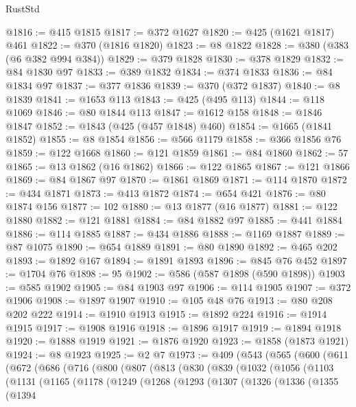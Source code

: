 \begin{lexlean}{RustStd}
\begin{coremodule}
@1816 := @415 @1815
@1817 := @372 @1627
@1820 := @425 (@1621 @1817) @461
@1822 := @370 (@1816 @1820)
@1823 := @8 @1822
@1828 := @380 (@383 (@6 @382 @994 @384))
@1829 := @379 @1828
@1830 := @378 @1829
@1832 := @84 @1830 @97
@1833 := @389 @1832
@1834 := @374 @1833
@1836 := @84 @1834 @97
@1837 := @377 @1836
@1839 := @370 (@372 @1837)
@1840 := @8 @1839
@1841 := @1653 @113
@1843 := @425 (@495 @113)
@1844 := @118 @1069
@1846 := @80 @1844 @113
@1847 := @1612 @158
@1848 := @1846 @1847
@1852 := @1843 (@425 (@457 @1848) @460)
@1854 := @1665 (@1841 @1852)
@1855 := @8 @1854
@1856 := @566 @1179
@1858 := @366 @1856 @76
@1859 := @122 @1668
@1860 := @121 @1859
@1861 := @84 @1860
@1862 := 57
@1865 := @13 @1862 (@16 @1862)
@1866 := @122 @1865
@1867 := @121 @1866
@1869 := @84 @1867 @97
@1870 := @1861 @1869
@1871 := @114 @1870
@1872 := @434 @1871
@1873 := @413 @1872
@1874 := @654 @421
@1876 := @80 @1874 @156
@1877 := 102
@1880 := @13 @1877 (@16 @1877)
@1881 := @122 @1880
@1882 := @121 @1881
@1884 := @84 @1882 @97
@1885 := @441 @1884
@1886 := @114 @1885
@1887 := @434 @1886
@1888 := @1169 @1887
@1889 := @87 @1075
@1890 := @654 @1889
@1891 := @80 @1890
@1892 := @465 @202
@1893 := @1892 @167
@1894 := @1891 @1893
@1896 := @845 @76 @452
@1897 := @1704 @76
@1898 := 95
@1902 := @586 (@587 @1898 (@590 @1898))
@1903 := @585 @1902
@1905 := @84 @1903 @97
@1906 := @114 @1905
@1907 := @372 @1906
@1908 := @1897 @1907
@1910 := @105 @48 @76
@1913 := @80 @208 @202 @222
@1914 := @1910 @1913
@1915 := @1892 @224
@1916 := @1914 @1915
@1917 := @1908 @1916
@1918 := @1896 @1917
@1919 := @1894 @1918
@1920 := @1888 @1919
@1921 := @1876 @1920
@1923 := @1858 (@1873 @1921)
@1924 := @8 @1923
@1925 := @2 @7
@1973 := @409
    (@543
      (@565
        (@600
          (@611
            (@672
              (@686
                (@716
                  (@800
                    (@807
                      (@813
                        (@830
                          (@839
                            (@1032
                              (@1056
                                (@1103
                                  (@1131
                                    (@1165
                                      (@1178
                                        (@1249
                                          (@1268
                                            (@1293
                                              (@1307
                                                (@1326
                                                  (@1336
                                                    (@1355
                                                      (@1394

\end{coremodule}
\end{lexlean}
